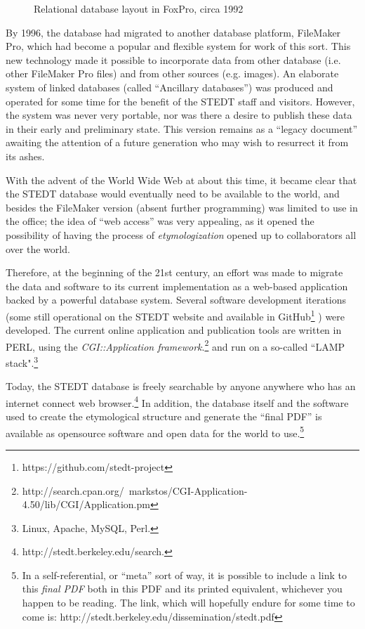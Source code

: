 \begin{figure}[ht]
\centering
{}
\caption{Relational database layout in FoxPro, circa 1992}
\label{fig:foxpro}
\end{figure}


By 1996, the database had migrated to another database platform,
FileMaker Pro\texttrademark, which had become a popular and flexible system for work
of this sort.   This new technology made it possible to incorporate
data from other database (i.e. other FileMaker Pro files) and from other
sources (e.g. images). An elaborate system of linked databases (called
``Ancillary databases'') was produced and operated for some time for
the benefit of the STEDT staff and visitors. However, the system was
never very portable, nor was there a desire to publish these data in
their early and preliminary state. This version remains as a ``legacy
document'' awaiting the attention of a future generation who may wish
to resurrect it from its ashes.

With the advent of the World Wide Web at about this time, it became clear that
the STEDT database would eventually need to be available to the world,
and besides the FileMaker version (absent further programming) was
limited to use in the office; the idea of ``web access'' was very
appealing, as it opened the possibility of having the process of {\it etymologization}
opened up to collaborators all over the world.

Therefore, at the beginning of the 21st century, an effort was made to
migrate the data and software to its current implementation as a
web-based application backed by a powerful database system.  Several
software development iterations (some still operational on the STEDT
website and available in GitHub\footnote{https://github.com/stedt-project} ) were developed.   
The current online application and publication tools are written in
PERL, using the {\it CGI::Application framework}.\footnote{http://search.cpan.org/~markstos/CGI-Application-4.50/lib/CGI/Application.pm}
and run on a so-called ``LAMP stack".\footnote{Linux, Apache, MySQL, Perl.}

Today, the STEDT database is freely searchable by anyone anywhere who has
an internet connect web browser.\footnote{http://stedt.berkeley.edu/search.}
In addition, the database itself and
the software used to create the etymological structure and generate
the ``final PDF'' is available as opensource software and open data for the world to
use.\footnote{In a self-referential, or ``meta'' sort of way, it is
  possible to include a link to this {\it final PDF} both in this PDF and
  its printed equivalent, whichever you happen to be reading. The
  link, which will hopefully endure for some time to come is: http://stedt.berkeley.edu/dissemination/stedt.pdf}


